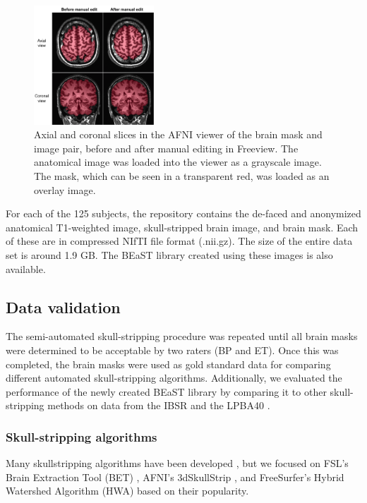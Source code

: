 \begin{figure}[h!]
    \includegraphics[width=0.4\textwidth]{edit.png}
    \caption{
Axial and coronal slices in the AFNI viewer of the brain mask and image pair, before and after manual editing in Freeview. The anatomical image was loaded into the viewer as a grayscale image. The mask, which can be seen in a transparent red, was loaded as an overlay image.}
\label{fig:edit}
\end{figure}

For each of the 125 subjects, the repository contains the de-faced and anonymized anatomical T1-weighted image, skull-stripped brain image, and brain mask. Each of these are in compressed NIfTI file format (.nii.gz). The size of the entire data set is around 1.9 GB. The BEaST library created using these images is also available.


\subsection*{Data validation}

The semi-automated skull-stripping procedure was repeated until all brain masks were determined to be acceptable by two raters (BP and ET). Once this was completed, the brain masks were used as gold standard data for comparing different automated skull-stripping algorithms.  Additionally, we evaluated the performance of the newly created BEaST library by comparing it to other skull-stripping methods on data from the IBSR \cite{IBSR} and the LPBA40 \cite{lpba40}.

\subsubsection*{Skull-stripping algorithms}
Many skullstripping algorithms have been developed \cite{Iglesias2011, MASS, Brainwash, Sadananthan2010, Lutkenhoff2014, Wang2014, pmid21195780, bse}, but we focused on FSL's Brain Extraction Tool (BET) \cite{Smith2002}, AFNI's 3dSkullStrip \cite{afni}, and FreeSurfer's Hybrid Watershed Algorithm (HWA) \cite{Segonne2004} based on their popularity.

